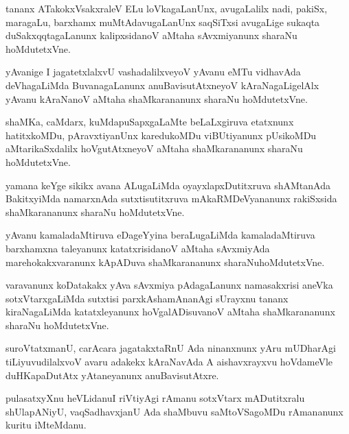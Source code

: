 \begin{mng}
tananx ATakokxVsakxraleV ELu loVkagaLanUnx, avugaLalilx nadi, pakiSx, maragaLu, barxhamx muMtAdavugaLanUnx saqSiTxsi avugaLige sukaqta duSakxqqtagaLanunx kalipxsidanoV aMtaha sAvxmiyanunx sharaNu hoMdutetxVne.
\end{mng}

\begin{mng}
yAvanige I jagatetxlalxvU vashadalilxveyoV yAvanu eMTu vidhavAda deVhagaLiMda BuvanagaLanunx anuBavisutAtxneyoV kAraNagaLigelAlx yAvanu kAraNanoV aMtaha shaMkarananunx sharaNu hoMdutetxVne.
\end{mng}

\begin{mng}
shaMKa, caMdarx, kuMdapuSapxgaLaMte beLaLxgiruva etatxnunx hatitxkoMDu, pAravxtiyanUnx karedukoMDu viBUtiyanunx pUsikoMDu aMtarikaSxdalilx hoVgutAtxneyoV aMtaha shaMkarananunx sharaNu hoMdutetxVne.
\end{mng}

\begin{mng}
yamana keYge sikikx avana ALugaLiMda oyayxlapxDutitxruva shAMtanAda BakitxyiMda namarxnAda sutxtisutitxruva mAkaRMDeVyananunx rakiSxsida shaMkarananunx sharaNu hoMdutetxVne.
\end{mng}

\begin{mng}
yAvanu kamaladaMtiruva eDageYyina beraLugaLiMda kamaladaMtiruva barxhamxna taleyanunx katatxrisidanoV aMtaha sAvxmiyAda marehokakxvaranunx kApADuva shaMkarananunx sharaNuhoMdutetxVne.
\end{mng}

\begin{mng}
varavanunx koDatakakx yAva sAvxmiya pAdagaLanunx namasakxrisi aneVka sotxVtarxgaLiMda sutxtisi parxkAshamAnanAgi sUrayxnu tananx kiraNagaLiMda katatxleyanunx hoVgalADisuvanoV aMtaha shaMkarananunx sharaNu hoMdutetxVne.
\end{mng}

\begin{mng}
suroVtatxmanU, carAcara jagatakxtaRnU Ada ninanxnunx yAru mUDharAgi tiLiyuvudilalxvoV avaru adakekx kAraNavAda A aishavxrayxvu hoVdameVle duHKapaDutAtx yAtaneyanunx anuBavisutAtxre.
\end{mng}

\begin{mng}
pulasatxyXnu heVLidanu\mdash I riVtiyAgi rAmanu sotxVtarx mADutitxralu shUlapANiyU, vaqSadhavxjanU Ada shaMbuvu saMtoVSagoMDu rAmananunx kuritu iMteMdanu.
\end{mng}

